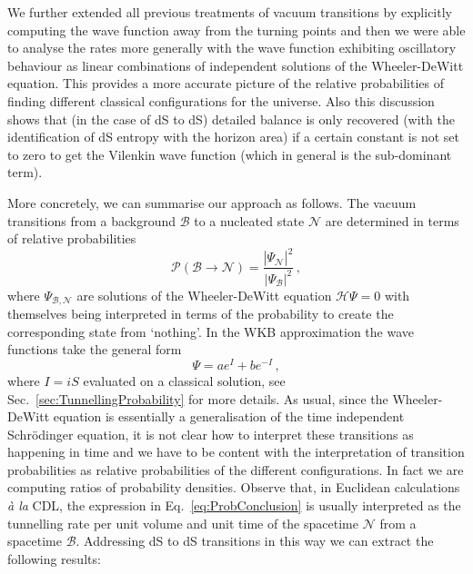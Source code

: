 \documentclass[11pt,a4paper]{article}
\newcommand{\be}{\begin{equation}}
\newcommand{\ee}{\end{equation}}
\begin{document}
We further  extended all previous treatments of vacuum transitions by explicitly computing the wave function away from the turning points and then we were able to analyse the rates more generally with the wave function exhibiting oscillatory behaviour as linear combinations of independent solutions of the Wheeler-DeWitt equation. This provides a more accurate picture of the relative probabilities of finding different classical configurations for the universe. Also this discussion shows that (in the case of dS to dS) detailed balance is only recovered (with the identification of dS entropy with the horizon area) if a certain constant is not set to zero to get the Vilenkin wave function (which in general is the sub-dominant term). 
 
More concretely, we can summarise our approach as follows. The vacuum transitions from a background $\mathcal{B}$ to a nucleated state $\mathcal{N}$ are determined in terms of relative probabilities
\be
\label{eq:ProbConclusion}
\mathcal{P}\left(\mathcal{B}\rightarrow \mathcal{N}\right)=\frac{|\Psi_\mathcal{N}|^2}{|\Psi_\mathcal{B}|^2} \,,
\ee
where $\Psi_{\mathcal{B},\mathcal{N}}$ are solutions of the Wheeler-DeWitt equation $\mathcal{H} \Psi=0$ with themselves being interpreted in terms of the probability to create the corresponding state from `nothing'. In the WKB approximation the wave functions take the general form 
\be
\Psi=a e^I + b e^{-I} \,,
\ee
where $I = i S$ evaluated on a classical solution, see Sec.~\ref{sec:TunnellingProbability} for more details. As usual, since the Wheeler-DeWitt equation is essentially a generalisation of the time independent  Schr\"odinger equation, it is not clear how to interpret these transitions as happening in time and we have to be content with the interpretation of transition probabilities as relative probabilities of the different configurations. In fact we are computing ratios of probability densities. Observe that, in Euclidean calculations \textit{à la} CDL, the expression in Eq.~\eqref{eq:ProbConclusion} is usually interpreted as the tunnelling rate per unit volume and unit time of the spacetime $\mathcal{N}$ from a spacetime $\mathcal{B}$. Addressing  dS to dS transitions in this way we can extract the following results:
\end{document}
